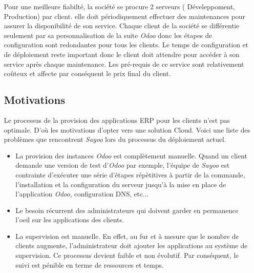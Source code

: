 \begin{onehalfspace}
Pour une meilleure fiabilté, la société se procure 2 serveurs ( Déveleppoment, Production) par client. elle doit périodiquement effectuer des maintenances pour assurer la disponibilité de son service. Chaque client de la société se différentie seulement par sa personnalisation de la suite \emph{Odoo} donc les étapes de configuration sont redondantes pour tous les clients. Le temps de configuration et de déploiement reste important donc le client doit attendre pour accéder à son service après chaque maintenance. Les pré-requis de ce service sont relativement coûteux et affecte par conséquent le prix final du client.
  
















\subsection{Motivations}

Le processus de la provision des applications ERP pour les clients n'est pas optimale. D'où les motivations d'opter vers une solution Cloud. Voici une liste des problèmes que rencontrent \emph{Sayoo} lors du processus du déploiement actuel.

\begin{itemize}

\item La provision des instances \emph{Odoo} est complètement manuelle. Quand un client demande une version de test d'\emph{Odoo} par exemple, l'équipe de \emph{Sayoo} est contrainte d'exécuter une série d'étapes répètitives à partir de la commande, l'installation et la configuration du serveur jusqu'à la mise en place de l'application \emph{Odoo}, configuration DNS, etc...

\item Le besoin récurrent des administrateurs qui doivent garder en permanence l'oeil sur les applications des clients.

\item La supervision est manuelle. En effet, au fur et à mesure que le nombre de clients augmente, l'administrateur doit ajouter les applications au système de supervision. Ce processus devient faible et non évolutif. Par conséquent, le suivi est pénible en terme de ressources et temps.


\end{itemize}
\end{onehalfspace}
